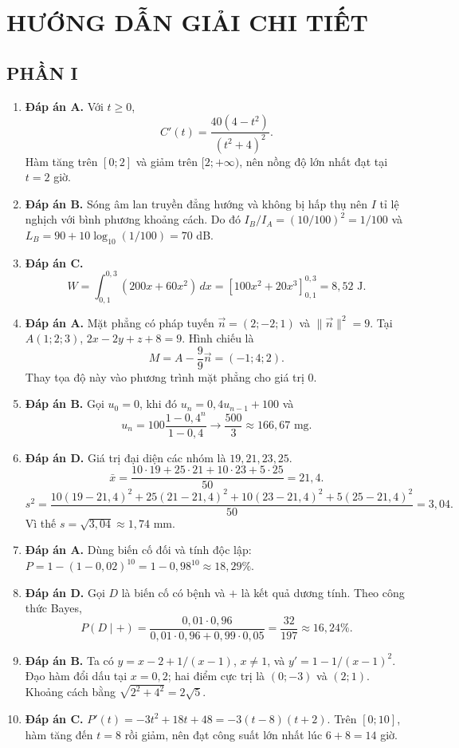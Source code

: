 \documentclass[12pt,a4paper]{article}
\begin{document}
\newpage
\section*{HƯỚNG DẪN GIẢI CHI TIẾT}
\subsection*{PHẦN I}
\begin{enumerate}[label=\textbf{Câu \arabic*:}, leftmargin=*]
\item \textbf{Đáp án A.} Với $t\ge0$,
\[
C'(t)=\frac{40(4-t^2)}{(t^2+4)^2}.
\]
Hàm tăng trên $[0;2]$ và giảm trên $[2;+\infty)$, nên nồng độ lớn nhất đạt tại $t=2$ giờ.
\item \textbf{Đáp án B.} Sóng âm lan truyền đẳng hướng và không bị hấp thụ nên $I$ tỉ lệ nghịch với bình phương khoảng cách. Do đó $I_B/I_A=(10/100)^2=1/100$ và $L_B=90+10\log_{10}(1/100)=70$ dB.
\item \textbf{Đáp án C.}
\[
W=\int_{0{,}1}^{0{,}3}(200x+60x^2)\,dx
 =[100x^2+20x^3]_{0{,}1}^{0{,}3}=8{,}52\text{ J}.
\]
\item \textbf{Đáp án A.} Mặt phẳng có pháp tuyến $\vec n=(2;-2;1)$ và $\|\vec n\|^2=9$. Tại $A(1;2;3)$, $2x-2y+z+8=9$. Hình chiếu là
\[
M=A-\frac{9}{9}\vec n=(-1;4;2).
\]
Thay tọa độ này vào phương trình mặt phẳng cho giá trị $0$.
\item \textbf{Đáp án B.} Gọi $u_0=0$, khi đó $u_n=0{,}4u_{n-1}+100$ và
\[
u_n=100\frac{1-0{,}4^n}{1-0{,}4}\longrightarrow\frac{500}{3}\approx166{,}67\text{ mg}.
\]
\item \textbf{Đáp án D.} Giá trị đại diện các nhóm là $19,21,23,25$.
\[
\bar x=\frac{10\cdot19+25\cdot21+10\cdot23+5\cdot25}{50}=21{,}4.
\]
\[
s^2=\frac{10(19-21{,}4)^2+25(21-21{,}4)^2+10(23-21{,}4)^2+5(25-21{,}4)^2}{50}=3{,}04.
\]
Vì thế $s=\sqrt{3{,}04}\approx1{,}74$ mm.
\item \textbf{Đáp án A.} Dùng biến cố đối và tính độc lập: $P=1-(1-0{,}02)^{10}=1-0{,}98^{10}\approx18{,}29\%$.
\item \textbf{Đáp án D.} Gọi $D$ là biến cố có bệnh và $+$ là kết quả dương tính. Theo công thức Bayes,
\[
P(D\mid +)=\frac{0{,}01\cdot0{,}96}{0{,}01\cdot0{,}96+0{,}99\cdot0{,}05}
 =\frac{32}{197}\approx16{,}24\%.
\]
\item \textbf{Đáp án B.} Ta có $y=x-2+1/(x-1)$, $x\ne1$, và $y'=1-1/(x-1)^2$. Đạo hàm đổi dấu tại $x=0,2$; hai điểm cực trị là $(0;-3)$ và $(2;1)$. Khoảng cách bằng $\sqrt{2^2+4^2}=2\sqrt5$.
\item \textbf{Đáp án C.} $P'(t)=-3t^2+18t+48=-3(t-8)(t+2)$. Trên $[0;10]$, hàm tăng đến $t=8$ rồi giảm, nên đạt công suất lớn nhất lúc $6+8=14$ giờ.

\end{enumerate}
\end{document}
